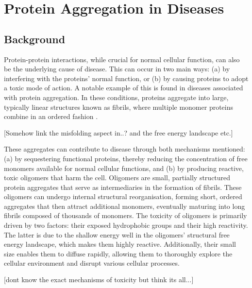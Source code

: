 \newcommand{\nc}[0]{n_{\mathrm{c}}}
\newcommand{\todo}[1]{{\color{red} [#1]}}

\chapter{\label{ch:4-aggregation}Protein Aggregation in Diseases}

\minitoc
\newpage

\section{Background}

Protein-protein interactions, while crucial for normal cellular function, can also be the underlying cause of disease. This can occur in two main ways: (a) by interfering with the proteins' normal function, or (b) by causing proteins to adopt a toxic mode of action. A notable example of this is found in diseases associated with protein aggregation. In these conditions, proteins aggregate into large, typically linear structures known as fibrils, where multiple monomer proteins combine in an ordered fashion \cite{chiti_protein_2006}.


\todo{Somehow link the misfolding aspect in..? and the free energy landscape etc.}

These aggregates can contribute to disease through both mechanisms mentioned: (a) by sequestering functional proteins, thereby reducing the concentration of free monomers available for normal cellular functions, and (b) by producing reactive, toxic oligomers that harm the cell. \cite{chiti_protein_2006, chiti_protein_2017} Oligomers are small, partially structured protein aggregates that serve as intermediaries in the formation of fibrils. These oligomers can undergo internal structural reorganisation, forming short, ordered aggregates that then attract additional monomers, eventually maturing into long fibrils composed of thousands of monomers. The toxicity of oligomers is primarily driven by two factors: their exposed hydrophobic groups and their high reactivity. The latter is due to the shallow energy well in the oligomers' structural free energy landscape, which makes them highly reactive. Additionally, their small size enables them to diffuse rapidly, allowing them to thoroughly explore the cellular environment and disrupt various cellular processes.


\todo{dont know the exact mechanisms of toxicity but think its all...}


\cite{chiti_protein_2017}


